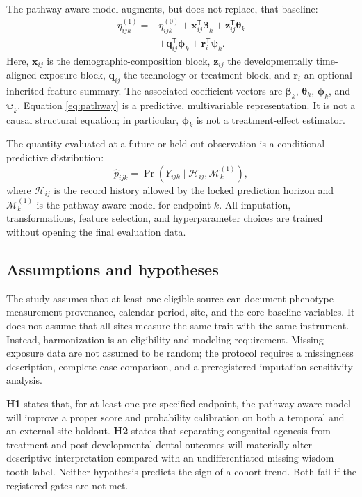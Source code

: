 \documentclass[conference]{IEEEtran}
\begin{document}
The pathway-aware model augments, but does not replace, that baseline:
\begin{align}
\eta^{(1)}_{ijk}={}&\eta^{(0)}_{ijk}
+\boldsymbol{x}_{ij}^{\mathsf{T}}\boldsymbol{\beta}_{k}
+\boldsymbol{z}_{ij}^{\mathsf{T}}\boldsymbol{\theta}_{k}\nonumber\\
&+\boldsymbol{q}_{ij}^{\mathsf{T}}\boldsymbol{\phi}_{k}
+\boldsymbol{r}_{i}^{\mathsf{T}}\boldsymbol{\psi}_{k}.
\label{eq:pathway}
\end{align}
Here, $\boldsymbol{x}_{ij}$ is the demographic-composition block,
$\boldsymbol{z}_{ij}$ the developmentally time-aligned exposure block,
$\boldsymbol{q}_{ij}$ the technology or treatment block, and
$\boldsymbol{r}_{i}$ an optional inherited-feature summary. The associated
coefficient vectors are $\boldsymbol{\beta}_{k}$,
$\boldsymbol{\theta}_{k}$, $\boldsymbol{\phi}_{k}$, and
$\boldsymbol{\psi}_{k}$. Equation \eqref{eq:pathway} is a predictive,
multivariable representation. It is not a causal structural equation; in
particular, $\boldsymbol{\phi}_{k}$ is not a treatment-effect estimator.

The quantity evaluated at a future or held-out observation is a conditional
predictive distribution:
\begin{equation}
\widehat{p}_{ijk}=\Pr(Y_{ijk}\mid\mathcal{H}_{ij},
\mathcal{M}^{(1)}_k),
\label{eq:prediction}
\end{equation}
where $\mathcal{H}_{ij}$ is the record history allowed by the locked
prediction horizon and $\mathcal{M}^{(1)}_k$ is the pathway-aware model for
endpoint $k$. All imputation, transformations, feature selection, and
hyperparameter choices are trained without opening the final evaluation data.

\subsection{Assumptions and hypotheses}

The study assumes that at least one eligible source can document phenotype
measurement provenance, calendar period, site, and the core baseline
variables. It does not assume that all sites measure the same trait with the
same instrument. Instead, harmonization is an eligibility and modeling
requirement. Missing exposure data are not assumed to be random; the protocol
requires a missingness description, complete-case comparison, and a
preregistered imputation sensitivity analysis.

\textbf{H1} states that, for at least one pre-specified endpoint, the
pathway-aware model will improve a proper score and probability calibration on
both a temporal and an external-site holdout. \textbf{H2} states that
separating congenital agenesis from treatment and post-developmental dental
outcomes will materially alter descriptive interpretation compared with an
undifferentiated missing-wisdom-tooth label. Neither hypothesis predicts the
sign of a cohort trend. Both fail if the registered gates are not met.
\end{document}
